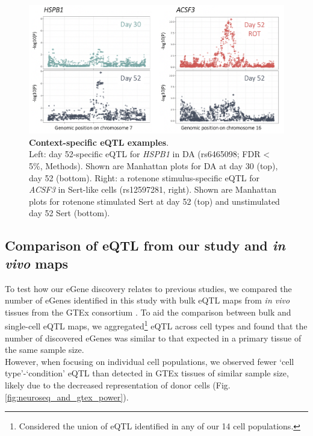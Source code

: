 \begin{figure}[h]
\includegraphics[width=16cm]{Chapter5/Fig/neuroseq_eqtl_examples.png}
\caption[Context-specific eQTL examples]{\textbf{Context-specific eQTL examples}.\\
Left: day 52-specific eQTL for \textit{HSPB1} in DA (rs6465098; FDR < 5\%, Methods). 
Shown are Manhattan plots for DA at day 30 (top), day 52 (bottom). 
Right: a rotenone stimulus-specific eQTL for \textit{ACSF3} in Sert-like cells (rs12597281, right). 
Shown are Manhattan plots for rotenone stimulated Sert at day 52 (top) and unstimulated day 52 Sert (bottom).}
\label{fig:neuroseq_eqtl_examples}
\end{figure}

\clearpage

\subsection{Comparison of eQTL from our study and \textit{in vivo} maps}

To test how our eGene discovery relates to previous studies, we compared the number of eGenes identified in this study with bulk eQTL maps from \textit{in vivo} tissues from the GTEx consortium \cite{gtex2017genetic}. 
To aid the comparison between bulk and single-cell eQTL maps,
we aggregated\footnote{Considered the union of eQTL identified in any of our 14 cell populations.} eQTL across cell types and found that the number of discovered eGenes was similar to that expected in a primary tissue of the same sample size. \\

However, when focusing on individual cell populations, we observed fewer `cell type'-`condition' eQTL than detected in GTEx tissues of similar sample size, likely due to the decreased representation of donor cells (Fig. \ref{fig:neuroseq_and_gtex_power}).\\

